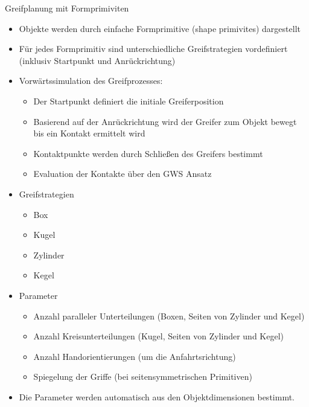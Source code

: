 \documentclass[paper=a4, fontsize=11pt]{scrartcl} %
\numberwithin{equation}{section} %
\numberwithin{figure}{section} %
\numberwithin{table}{section} %
\begin{document}
Greifplanung mit Formprimiviten
\begin{itemize}
\item Objekte werden durch einfache Formprimitive (shape primivites) dargestellt
\item Für jedes Formprimitiv sind unterschiedliche Greifstrategien vordefiniert (inklusiv Startpunkt und Anrückrichtung)
\item Vorwärtssimulation des Greifprozesses:
\begin{itemize}
\item Der Startpunkt definiert die initiale Greiferposition
\item Basierend auf der Anrückrichtung wird der Greifer zum Objekt bewegt bis ein Kontakt ermittelt wird
\item Kontaktpunkte werden durch Schließen des Greifers bestimmt
\item Evaluation der Kontakte über den GWS Ansatz
\end{itemize}
\item Greifstrategien
\begin{itemize}
\item Box
\item Kugel
\item Zylinder
\item Kegel
\end{itemize}
\item Parameter
\begin{itemize}
\item Anzahl paralleler Unterteilungen (Boxen, Seiten von Zylinder und Kegel)
\item Anzahl Kreisunterteilungen (Kugel, Seiten von Zylinder und Kegel)
\item Anzahl Handorientierungen (um die Anfahrtsrichtung)
\item Spiegelung der Griffe (bei seitensymmetrischen Primitiven)
\end{itemize}
\item Die Parameter werden automatisch aus den Objektdimensionen bestimmt.
\end{itemize}
\end{document}
